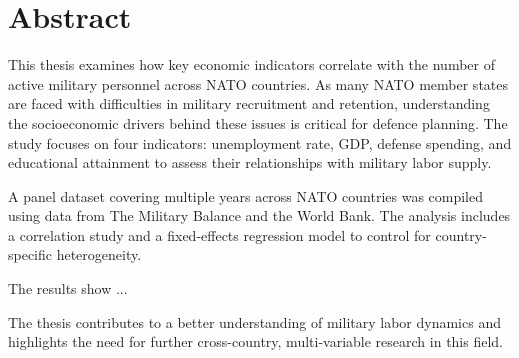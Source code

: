 \chapter{Abstract}

This thesis examines how key economic indicators correlate with the number of active 
military personnel across NATO countries. As many NATO member states are faced 
with difficulties in military recruitment and retention, understanding the socioeconomic 
drivers behind these issues is critical for defence planning. 
The study focuses on four indicators: unemployment rate, GDP, defense spending, 
and educational attainment to assess their relationships with military labor supply.

A panel dataset covering multiple years across NATO countries was compiled using 
data from The Military Balance and the World Bank. 
The analysis includes a correlation study and a 
fixed-effects regression model to control for country-specific heterogeneity.

The results show ...

The thesis contributes to a better understanding of military labor dynamics 
and highlights the need for further cross-country, 
multi-variable research in this field.